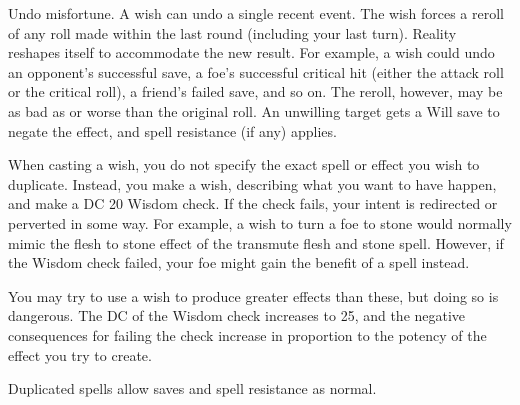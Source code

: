 \begin{spelleffect}
\begin{itemize*}
    \item Undo misfortune. A wish can undo a single recent event. The wish forces a reroll of any roll made within the last round (including your last turn). Reality reshapes itself to accommodate the new result. For example, a wish could undo an opponent's successful save, a foe's successful critical hit (either the attack roll or the critical roll), a friend's failed save, and so on. The reroll, however, may be as bad as or worse than the original roll. An unwilling target gets a Will save to negate the effect, and spell resistance (if any) applies.
  \end{itemize*}
  \par When casting a wish, you do not specify the exact spell or effect you wish to duplicate. Instead, you make a wish, describing what you want to have happen, and make a DC 20 Wisdom check. If the check fails, your intent is redirected or perverted in some way. For example, a wish to turn a foe to stone would normally mimic the flesh to stone effect of the transmute flesh and stone spell. However, if the Wisdom check failed, your foe might gain the benefit of a  spell instead.
  \par You may try to use a wish to produce greater effects than these, but doing so is dangerous. The DC of the Wisdom check increases to 25, and the negative consequences for failing the check increase in proportion to the potency of the effect you try to create.
\end{spelleffect}
\begin{spellnotes}
  Duplicated spells allow saves and spell resistance as normal.
\end{spellnotes}

